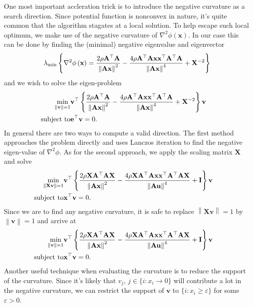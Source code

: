 \documentclass{article}
\newcommand{\x}{\mathbf{x}}
\newcommand{\A}{\mathbf{A}}
\newcommand{\0}{\textbf{0}}
\newcommand{\e}{\mathbf{e}}
\newcommand{\n}{\nabla}
\newcommand{\X}{\mathbf{X}}
\newcommand{\I}{\mathbf{I}}
\newcommand{\tmu}{\mathbf{u}}
\newcommand{\tmv}{\mathbf{v}}
\begin{document}
One most important accleration trick is to introduce the negative curvature as
a search direction. Since potential function is nonconvex in nature, it's
quite common that the algorithm stagates at a local solution. To help escape
such local optimum, we make use of the negative curvature of $\n^2 \phi \left(
\x \right)$. In our case this can be done by finding the (minimal) negative
eigenvalue and eigenvector
\[ \lambda_{\min} \left\{ \nabla^2 \phi \left( \x \right) = \frac{2 \rho
   \A^{\top} \A}{\left\| \A \x \right\|^2} - \frac{4 \rho \A^{\top} \A \x
   \x^{\top} \A^{\top} \A}{\left\| \A \x \right\|^4} + \small{\X^{- 2}}
   \right\} \]
and we wish to solve the eigen-problem
\begin{eqnarray*}
  \min_{\left\| \tmv \right\| = 1} & \tmv^{\top} \left\{ \frac{2 \rho
  \A^{\top} \A}{\left\| \A \x \right\|^2} - \frac{4 \rho \A^{\top} \A \x
  \x^{\top} \A^{\top} \A}{\left\| \A \x \right\|^4} + \small{\X^{- 2}}
  \right\} \tmv & \\
  \text{subject to} & \e^{\top} \tmv = 0. & 
\end{eqnarray*}
In general there are two ways to compute a valid direction. The first method
approaches the problem directly and uses Lanczos iteration to find the
negative eigen-value of $\n^2 \phi$. As for the second approach, we apply the
scaling matrix $\X$ and solve
\begin{eqnarray*}
  \min_{\left\| \X \tmv \right\| = 1} & \tmv^{\top} \left\{ \frac{2 \rho \X
  \A^{\top} \A \X}{\left\| \A \x \right\|^2} - \frac{4 \rho \X \A^{\top} \A \x
  \x^{\top} \A^{\top} \A \X}{\left\| \A \tmu \right\|^4} + \small{\I} \right\}
  \small{} \tmv & \\
  \text{subject to} & \x^{\top} \tmv = 0. & 
\end{eqnarray*}
Since we are to find any negative curvature, it is safe to replace $\left\| \X
\tmv \right\| = 1$ by $\left\| \tmv \right\| = 1$ and arrive at
\begin{eqnarray*}
  \min_{\left\| \tmv \right\| = 1} & \tmv^{\top} \left\{ \frac{2 \rho \X
  \A^{\top} \A \X}{\left\| \A \x \right\|^2} - \frac{4 \rho \X \A^{\top} \A \x
  \x^{\top} \A^{\top} \A \X}{\left\| \A \tmu \right\|^4} + \small{\I} \right\}
  \small{} \tmv & \\
  \text{subject to} & \x^{\top} \tmv = 0. & 
\end{eqnarray*}
Another useful technique when evaluating the curvature is to reduce the
support of the curvature. Since it's likely that $v_j$, $j \in \{ i : x_i
\rightarrow 0 \}$ will contribute a lot in the negative curvature, we can
restrict the support of $\tmv$ to $\{ i : x_i \geq \varepsilon \}$ for some
$\varepsilon > 0$.
\end{document}
